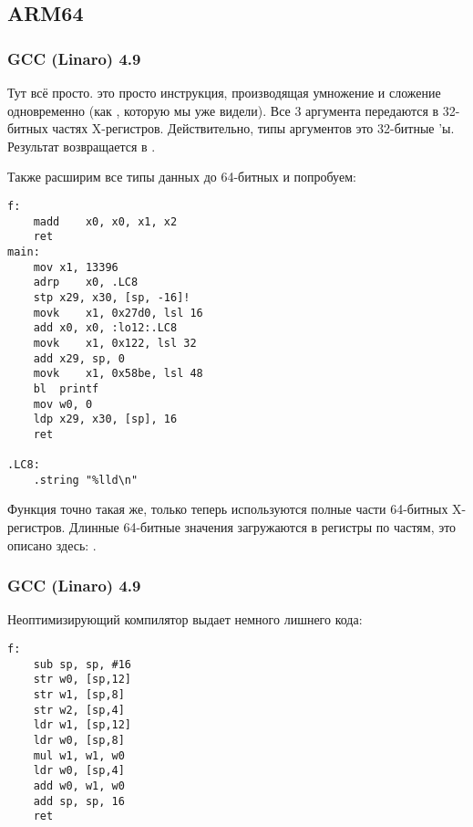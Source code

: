 \subsection{ARM64}

\subsubsection{\Optimizing GCC (Linaro) 4.9}

Тут всё просто.
 это просто инструкция, производящая умножение и сложение одновременно (как , 
которую мы уже видели).
Все 3 аргумента передаются в 32-битных частях X-регистров.
Действительно, типы аргументов это 32-битные 'ы.
Результат возвращается в .



Также расширим все типы данных до 64-битных  и попробуем:



\begin{lstlisting}
f:
	madd	x0, x0, x1, x2
	ret
main:
	mov	x1, 13396
	adrp	x0, .LC8
	stp	x29, x30, [sp, -16]!
	movk	x1, 0x27d0, lsl 16
	add	x0, x0, :lo12:.LC8
	movk	x1, 0x122, lsl 32
	add	x29, sp, 0
	movk	x1, 0x58be, lsl 48
	bl	printf
	mov	w0, 0
	ldp	x29, x30, [sp], 16
	ret

.LC8:
	.string	"%lld\n"
\end{lstlisting}

Функция \ttf{} точно такая же, только теперь используются полные части 64-битных X-регистров.
Длинные 64-битные значения загружаются в регистры по частям, это описано здесь: .

\subsubsection{\NonOptimizing GCC (Linaro) 4.9}

Неоптимизирующий компилятор выдает немного лишнего кода:

\begin{lstlisting}
f:
	sub	sp, sp, #16
	str	w0, [sp,12]
	str	w1, [sp,8]
	str	w2, [sp,4]
	ldr	w1, [sp,12]
	ldr	w0, [sp,8]
	mul	w1, w1, w0
	ldr	w0, [sp,4]
	add	w0, w1, w0
	add	sp, sp, 16
	ret
\end{lstlisting}

